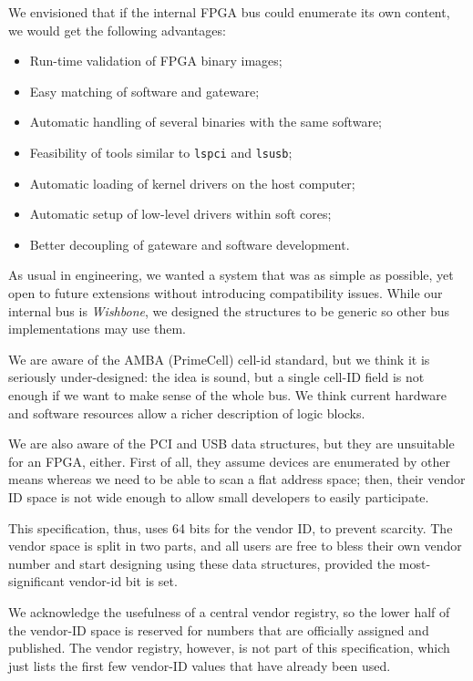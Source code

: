 \documentclass[a4paper, 12pt]{article}
\begin{document}
We envisioned that if the internal FPGA bus could enumerate its own
content, we would get the following advantages:

\begin{itemize}
\item Run-time validation of FPGA binary images;
\item Easy matching of software and gateware;
\item Automatic handling of several binaries with the same software;
\item Feasibility of tools similar to \texttt{lspci} and \texttt{lsusb};
\item Automatic loading of kernel drivers on the host computer;
\item Automatic setup of low-level drivers within soft cores;
\item Better decoupling of gateware and software development.
\end{itemize}

As usual in engineering, we wanted a system that was as simple as possible,
yet open to future extensions without introducing compatibility issues.
While our internal bus is \textit{Wishbone}, we designed the structures
to be generic so other bus implementations may use them. 

We are aware of the AMBA (PrimeCell) cell-id standard, but we think it
is seriously under-designed: the idea is sound, but a single cell-ID field
is not enough if we want to make sense of the whole bus. We think current
hardware and software resources allow a richer description of logic blocks.

We are also aware of the PCI and USB data structures, but they are
unsuitable for an FPGA, either. First of all, they assume devices are
enumerated by other means whereas we need to be able to scan a flat
address space; then, their vendor ID space is not wide enough to allow
small developers to easily participate.

This specification, thus, uses 64 bits for the vendor ID, to prevent scarcity.
The vendor space is split in two parts, and all users are free to bless their
own vendor number and start designing using these data structures,
provided the most-significant vendor-id bit is set.

We acknowledge the usefulness of a central vendor registry, so
the lower half of the
vendor-ID space is reserved for numbers that
are officially assigned and published.  The vendor registry, however, is not
part of this specification, which just lists the first few vendor-ID values that
have already been used.
\end{document}
